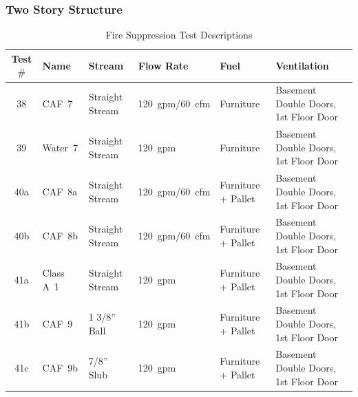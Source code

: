 \documentclass[12pt,oneside]{book}
\begin{document}
\subsubsection*{Two Story Structure}
\label{sec:fire_supp_two}

\begin{table}[!ht]
\centering
\footnotesize
\caption{Fire Suppression Test Descriptions}\label{tab:Test_Descriptions_2}
\begin{tabular}{clllll}
\toprule[1.5pt]
Test $\#$  & Name	& Stream			& Flow Rate		& Fuel                    & Ventilation  \\
\midrule
 38  & CAF~7     &  Straight Stream  	&  120~gpm/60~cfm   & Furniture           & Basement Double Doors, 1st Floor Door \\
 39  & Water~7   &  Straight Stream  	&  120~gpm    		& Furniture           & Basement Double Doors, 1st Floor Door \\
 40a & CAF~8a    &  Straight Stream  	&  120~gpm/60~cfm   & Furniture + Pallet  & Basement Double Doors, 1st Floor Door \\
 40b & CAF~8b    &  Straight Stream  	&  120~gpm/60~cfm   & Furniture + Pallet  & Basement Double Doors, 1st Floor Door \\
 41a & Class A~1 &  Straight Stream  	&  120~gpm		    & Furniture + Pallet  & Basement Double Doors, 1st Floor Door \\
 41b & CAF~9     &  1 3/8'' Ball    	&  120~gpm		    & Furniture + Pallet  & Basement Double Doors, 1st Floor Door \\
 41c & CAF~9b    &  7/8'' Slub      	&  120~gpm		    & Furniture + Pallet  & Basement Double Doors, 1st Floor Door \\
\bottomrule[1.25pt]
\end{tabular}\par
\end{table}
\end{document}

